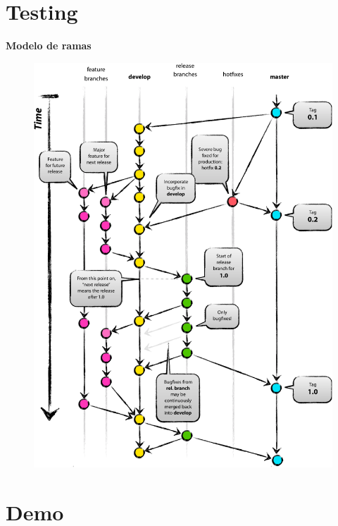 \documentclass[11pt]{beamer}
\begin{document}
\section{Testing}

\begin{frame}{\textbf{\LARGE{Modelo de ramas}}}
	\vspace{-.7cm}
	\begin{figure}[H]
		{\includegraphics[height=.8\textheight]{./imagenes/Git-branching-model.pdf}}
	\end{figure}	
\end{frame}

\section{Demo}
\end{document}
